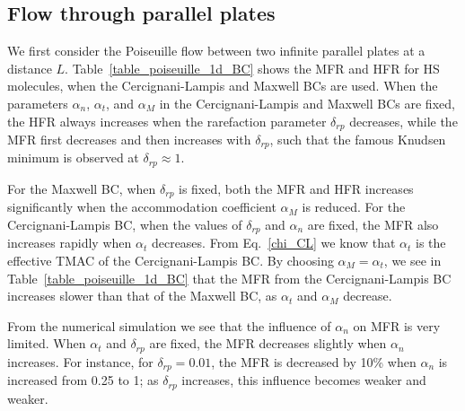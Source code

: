 \subsection{Flow through parallel plates}

We first consider the Poiseuille flow between two infinite parallel plates at a distance $L $. Table~\ref{table_poiseuille_1d_BC} shows the MFR and HFR for HS molecules, when the Cercignani-Lampis and Maxwell  BCs are used. When the parameters $\alpha _{n}$, $\alpha _{t}$, and $\alpha _{M}$ in the Cercignani-Lampis and Maxwell  BCs are fixed, the HFR always increases when the rarefaction parameter $\delta_{rp} $ decreases, while the MFR first decreases and then increases with $\delta_{rp} $, such that the famous Knudsen minimum is observed at $\delta_{rp} \approx 1$. 


For the Maxwell BC, when $\delta_{rp} $ is fixed, both the MFR and HFR increases significantly when the  accommodation coefficient $\alpha _{M}$ is reduced. For the Cercignani-Lampis  BC, when the values of $\delta_{rp} $ and $\alpha _{n}$ are fixed, the MFR also increases rapidly when $\alpha _{t}$ decreases. From Eq.~\eqref{chi_CL} we know that $\alpha _{t}$ is the effective TMAC of the Cercignani-Lampis  BC. By choosing $\alpha _{M}=\alpha _{t}$, we see in Table~\ref{table_poiseuille_1d_BC} that the MFR from the Cercignani-Lampis  BC increases slower than that of the Maxwell  BC, as $\alpha _{t}$ and $\alpha_{M}$ decrease.





From the numerical simulation we see that the influence of $\alpha _{n}$ on MFR is  very limited. When $\alpha _{t}$ and $\delta_{rp}$ are fixed, the MFR decreases slightly when $\alpha _{n}$ increases. For instance, for $\delta_{rp} =0.01$, the MFR is decreased by 10\% when $\alpha _{n}$ is increased from 0.25 to 1; as $\delta_{rp} $ increases, this influence becomes weaker and weaker. 


	

